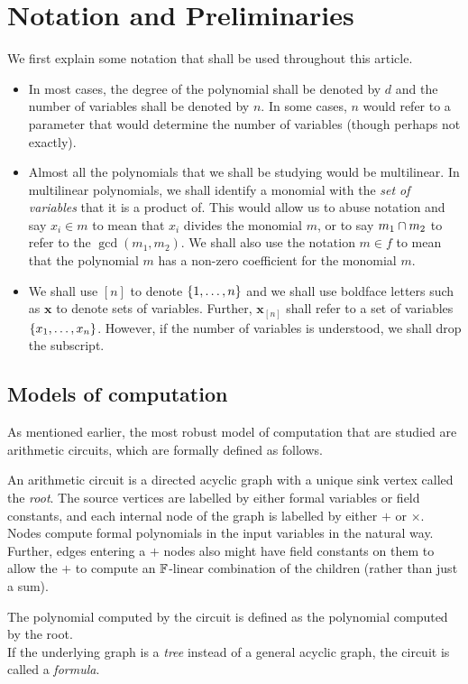\chapter{Notation and Preliminaries}\label{chap:notation}

We first explain some notation that shall be used throughout this article. 

\begin{itemize}
\item In most cases, the degree of the polynomial shall be denoted by $d$ and the number of variables shall be denoted by $n$. 
In some cases, $n$ would refer to a parameter that would determine the number of variables (though perhaps not exactly). 
\item Almost all the polynomials that we shall be studying would be multilinear. 
In multilinear polynomials, we shall identify a monomial with the \emph{set of variables} that it is a product of. 
This would allow us to abuse notation and say $x_i \in m$ to mean that $x_i$ divides the monomial $m$, or to say $m_1 \cap m_2$ to refer to the $\gcd(m_1,m_2)$. 
We shall also use the notation $m \in f$ to mean that the polynomial $m$ has a non-zero coefficient for the monomial $m$. 
\item We shall use $[n]$ to denote $\left\{1,\dots, n\right\}$ and we shall use boldface letters such as $\mathbf{x}$ to denote sets of variables. 
Further, $\mathbf{x}_{[n]}$ shall refer to a set of variables $\left\{x_1,\dots, x_n\right\}$. 
However, if the number of variables is understood, we shall drop the subscript. 
\end{itemize}


\section{Models of computation}

As mentioned earlier, the most robust model of computation that are studied are arithmetic circuits, which are formally defined as follows. 

\begin{definition}\label{defn:arithmetic-circuit}
An arithmetic circuit is a directed acyclic graph with a unique sink vertex called the \emph{root}. 
The source vertices are labelled by either formal variables or field constants, and each internal node of the graph is labelled by either $+$ or $\times$. 
Nodes compute formal polynomials in the input variables  in the natural way. 
Further, edges entering a $+$ nodes also might have field constants on them to allow the $+$ to compute an $\mathbb{F}$-linear combination of the children (rather than just a sum). 

The polynomial computed by the circuit is defined as the polynomial computed by the root. \\

\noindent
If the underlying graph is a \emph{tree} instead of a general acyclic graph, the circuit is called a \emph{formula}.
\end{definition}


